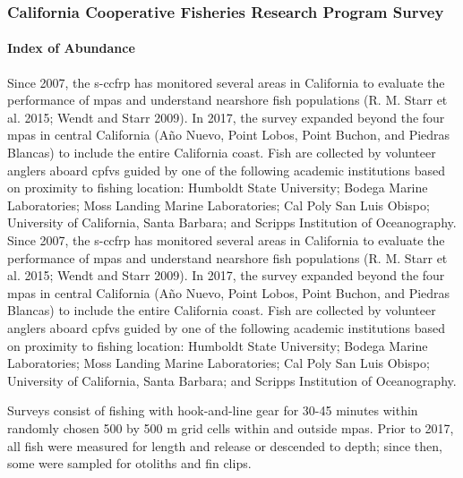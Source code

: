 \documentclass[11pt,
  english,
  letterpaper,
]{article}
\begin{document}
\hypertarget{california-cooperative-fisheries-research-program-survey}{%
\subsubsection{California Cooperative Fisheries Research Program Survey}\label{california-cooperative-fisheries-research-program-survey}}

\hypertarget{index-of-abundance}{%
\paragraph{Index of Abundance}\label{index-of-abundance}}

\hfill\break

Since 2007, the \gls{s-ccfrp} has monitored several areas in California to evaluate the performance of \glspl{mpa} and understand nearshore fish populations (R. M. Starr et al. 2015; Wendt and Starr 2009). In 2017, the survey expanded beyond the four \Gls{mpa}s in central California (Año Nuevo, Point Lobos, Point Buchon, and Piedras Blancas) to include the entire California coast. Fish are collected by volunteer anglers aboard \glspl{cpfv} guided by one of the following academic institutions based on proximity to fishing location: Humboldt State University; Bodega Marine Laboratories; Moss Landing Marine Laboratories; Cal Poly San Luis Obispo; University of California, Santa Barbara; and Scripps Institution of Oceanography. Since 2007, the \gls{s-ccfrp} has monitored several areas in California to evaluate the performance of \glspl{mpa} and understand nearshore fish populations (R. M. Starr et al. 2015; Wendt and Starr 2009). In 2017, the survey expanded beyond the four \Gls{mpa}s in central California (Año Nuevo, Point Lobos, Point Buchon, and Piedras Blancas) to include the entire California coast. Fish are collected by volunteer anglers aboard \glspl{cpfv} guided by one of the following academic institutions based on proximity to fishing location: Humboldt State University; Bodega Marine Laboratories; Moss Landing Marine Laboratories; Cal Poly San Luis Obispo; University of California, Santa Barbara; and Scripps Institution of Oceanography.

Surveys consist of fishing with hook-and-line gear for 30-45 minutes within randomly chosen 500 by 500 m grid cells within and outside \glspl{mpa}. Prior to 2017, all fish were measured for length and release or descended to depth; since then, some were sampled for otoliths and fin clips.
\end{document}
